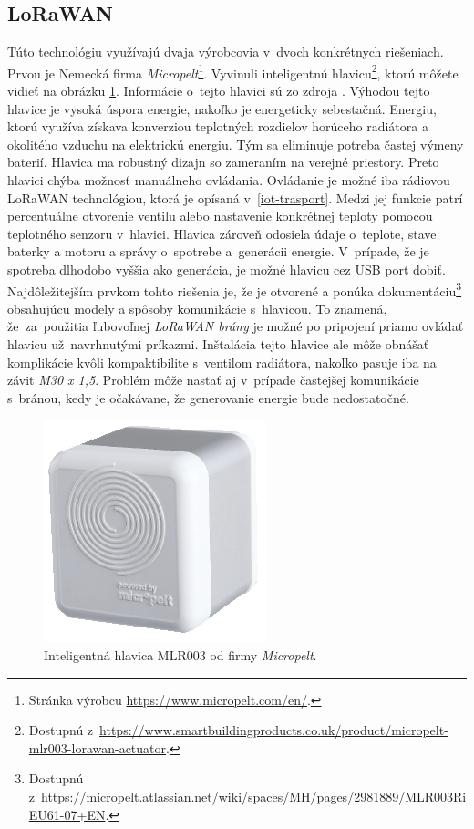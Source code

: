 \subsection*{LoRaWAN}
Túto technológiu využívajú dvaja výrobcovia v~dvoch konkrétnych riešeniach. Prvou je Nemecká firma \emph{Micropelt}\footnote{Stránka výrobcu \url{https://www.micropelt.com/en/}.}. 
Vyvinuli inteligentnú hlavicu\footnote{Dostupnú z~\url{https://www.smartbuildingproducts.co.uk/product/micropelt-mlr003-lorawan-actuator}.}, ktorú môžete vidieť na obrázku \ref{fig:LORA-MICROPELT}. 
Informácie o~tejto hlavici sú zo zdroja \cite{Micropelt_hlavica}. Výhodou tejto hlavice je vysoká úspora energie, nakoľko je energeticky sebestačná. 
Energiu, ktorú využíva získava konverziou teplotných rozdielov horúceho radiátora a okolitého vzduchu na elektrickú energiu. 
Tým sa eliminuje potreba častej výmeny baterií. Hlavica ma robustný dizajn so zameraním na verejné priestory. 
Preto hlavici chýba možnosť manuálneho ovládania. Ovládanie je možné iba rádiovou LoRaWAN technológiou, ktorá je opísaná v~\ref{iot-trasport}. 
Medzi jej funkcie patrí percentuálne otvorenie ventilu alebo nastavenie konkrétnej teploty pomocou teplotného senzoru v~hlavici. 
Hlavica zároveň odosiela údaje o~teplote, stave baterky a motoru a správy o~spotrebe a~generácii energie. 
V~prípade, že je spotreba dlhodobo vyššia ako generácia, je možné hlavicu cez USB port dobiť.
Najdôležitejším prvkom tohto riešenia je, že je otvorené a ponúka dokumentáciu\footnote{Dostupnú z~\url{https://micropelt.atlassian.net/wiki/spaces/MH/pages/2981889/MLR003RiEU61-07+EN}.} obsahujúcu modely a spôsoby komunikácie s~hlavicou. 
To znamená, že~za~použitia ľubovoľnej \emph{LoRaWAN brány} je možné po pripojení priamo ovládať hlavicu už~navrhnutými príkazmi.
Inštalácia tejto hlavice ale môže obnášať komplikácie kvôli kompaktibilite s~ventilom radiátora, nakoľko pasuje iba na závit \emph{M30 x 1,5}. 
Problém môže nastať aj v~prípade častejšej komunikácie s~bránou, kedy je očakávane, že generovanie energie bude nedostatočné.

\begin{figure}[H]
    \centering
    \includegraphics[scale=0.5]{obrazky-figures/_MLR003_UK-CERT_980x385_A_edited.png}
    \caption{Inteligentná hlavica MLR003 od firmy \emph{Micropelt}.}
    \label{fig:LORA-MICROPELT}
\end{figure}

